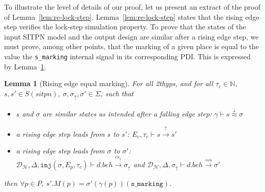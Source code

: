 \documentclass[pdflatex,sn-mathphys]{sn-jnl}%
\theoremstyle{thmstyleone}%
\theoremstyle{thmstyletwo}%
\theoremstyle{thmstylethree}%
\newtheorem{lemma}{Lemma}%
\begin{document}
To illustrate the level of details of our proof, let us present an
extract of the proof of
Lemma~\ref{lem:re-lock-step}. Lemma~\ref{lem:re-lock-step} states that
the rising edge step verifies the lock-step simulation property. To
prove that the states of the input SITPN model and the output design
are similar after a rising edge step, we must prove, among other
points, that the marking of a given place is equal to the value the
\texttt{s\_marking} internal signal in its corresponding PDI. This is
expressed by Lemma~\ref{lem:re-eq-marking}.

\begin{lemma}[Rising edge equal marking]
  \label{lem:re-eq-marking}
  For all \hm2thyps{}, and for all $\tau_c\in\mathbb{N}$,
  $s,s'\in{}S(sitpn)$, $\sigma,\sigma_\uparrow,\sigma'\in\Sigma$, such
  that
  \begin{itemize}
  \item $s$ and $\sigma$ are similar states as intended after a
    falling edge step:
    $\gamma\vdash{}s\stackrel{\downarrow}{\approx}\sigma$
  \item a rising edge step leads from $s$ to $s'$:
    $E_c,\tau_c\vdash{}s\xrightarrow{\uparrow}s'$
  \item a rising edge step leads from $\sigma$ to $\sigma'$:\\
    $\mathcal{D}_\mathcal{H},\Delta,\mathtt{inj}(\sigma,E_p,\tau_c)\vdash{}d.beh\xrightarrow{cs_{\uparrow}}\sigma_{\uparrow}$
    and
    $\mathcal{D}_\mathcal{H},\Delta,\sigma_{\uparrow}\vdash{}d.beh\xrightarrow{\rightsquigarrow}\sigma'$
  \end{itemize}
  then
  $\forall{}p\in{}P,~s'.M(p)=\sigma'(\gamma(p))(\mathtt{s\_marking})$.
  
\end{lemma}
\end{document}
